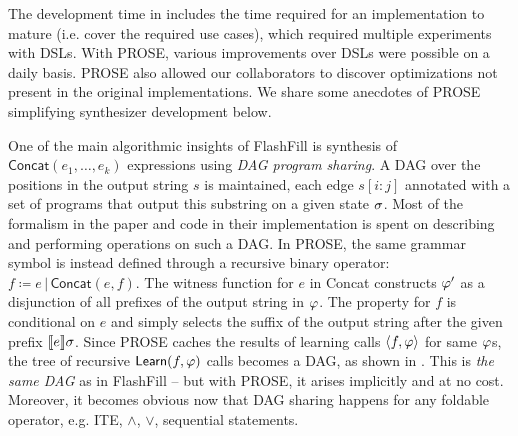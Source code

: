The development time in  includes the time required for an implementation to mature
(i.e. cover the required use cases), which required multiple experiments with DSLs.
With PROSE, various improvements over DSLs were possible on a daily basis.
PROSE also allowed our collaborators to discover optimizations not present in the original implementations.
We share some anecdotes of PROSE simplifying synthesizer development below.

\begin{scenario}
    One of the main algorithmic insights of FlashFill is synthesis of $\mathsf{Concat}(e_1, \dots, e_k)$ expressions
    using \emph{DAG program sharing}.
    A DAG over the positions in the output string $s$ is maintained, each edge $s[i:j]$ annotated with a
    set of programs that output this substring on a given state $\sigma$.
    Most of the formalism in the paper and code in their implementation is spent on describing and performing operations
    on such a DAG.
    In PROSE, the same grammar symbol is instead defined through a recursive binary operator: $f \coloneq e \,|\,
    \mathsf{Concat}(e, f)$.
    The witness function for $e$ in \textsf{Concat} constructs $\varphi'$ as a disjunction of all prefixes of
    the output string in $\varphi$.
    The property for $f$ is conditional on $e$ and simply selects the suffix of the output string after the given prefix
    $\llbracket e \rrbracket{\ensuremath{\sigma}}$.
    Since PROSE caches the results of learning calls $\langle f, \varphi \rangle$ for same $\varphi$s, the tree of
    recursive $\mathsf{Learn}(f, \varphi)$ calls becomes a DAG, as shown in .
    This is \emph{the same DAG} as in FlashFill -- but with PROSE, it arises implicitly and at no cost.
    Moreover, it becomes obvious now that DAG sharing happens for any foldable operator, e.g. \textsf{ITE}, $\wedge$,
    $\vee$, sequential statements.
    \label{sc:dag}
\end{scenario}

